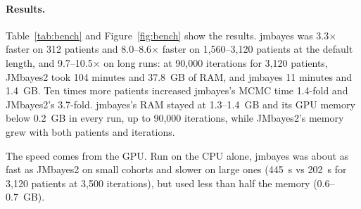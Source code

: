 \documentclass[11pt]{article}
\begin{document}
\paragraph{Results.} Table~\ref{tab:bench} and Figure~\ref{fig:bench} show the results.
jmbayes was 3.3$\times$ faster on 312 patients and 8.0--8.6$\times$ faster on 1,560--3,120
patients at the default length, and 9.7--10.5$\times$ on long runs: at 90,000 iterations
for 3,120 patients, JMbayes2 took 104 minutes and 37.8~GB of RAM, and jmbayes 11 minutes
and 1.4~GB. Ten times more patients increased jmbayes's MCMC time 1.4-fold and JMbayes2's
3.7-fold. jmbayes's RAM stayed at 1.3--1.4~GB and its GPU memory below 0.2~GB in every
run, up to 90,000 iterations, while JMbayes2's memory grew with both patients and
iterations.

The speed comes from the GPU. Run on the CPU alone, jmbayes was about as fast as JMbayes2
on small cohorts and slower on large ones (445~s vs 202~s for 3,120 patients at 3,500
iterations), but used less than half the memory (0.6--0.7~GB).
\end{document}
